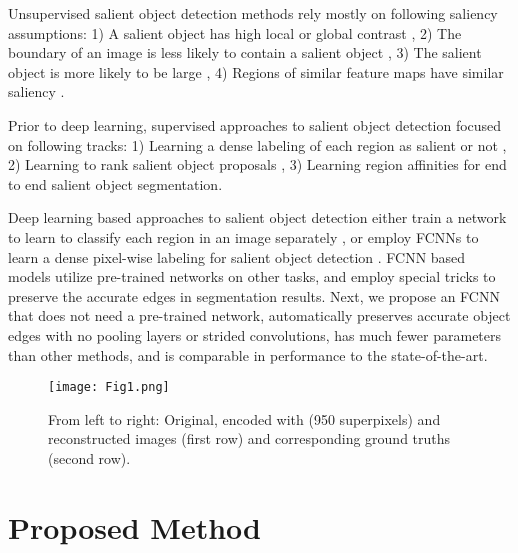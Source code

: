 \documentclass[a4paper,conference]{IEEEtran}
\begin{document}
Unsupervised salient object detection methods rely mostly on following saliency assumptions: 1) A salient object has high local or global contrast \cite{Cheng1,Aytekin1}, 2) The boundary of an image is less likely to contain a salient object \cite{Li2,Aytekin2}, 3) The salient object is more likely to be large \cite{Aytekin2}, 4) Regions of similar feature maps have similar saliency \cite{Aytekin3}.

Prior to deep learning, supervised approaches to salient object detection focused on following tracks: 1) Learning a dense labeling of each region as salient or not \cite{Jiang, Li3}, 2) Learning to rank salient object proposals \cite{Aytekin4}, 3) Learning region affinities for \cite{Aytekin5} end to end salient object segmentation.

Deep learning based approaches to salient object detection either train a network to learn to classify each region in an image separately \cite{Zhao, Li4,Gayoung}, or employ FCNNs to learn a dense pixel-wise labeling for salient object detection \cite{Wang,Li5}. FCNN based models utilize pre-trained networks on other tasks, and employ special tricks to preserve the accurate edges in segmentation results. Next, we propose an FCNN that does not need a pre-trained network, automatically preserves accurate object edges with no pooling layers or strided convolutions, has much fewer parameters than other methods, and is comparable in performance to the state-of-the-art.

\begin{figure}[!t]
\centering
\texttt{[image: Fig1.png]}
\caption{From left to right: Original, encoded with \cite{Fu} (950 superpixels) and reconstructed images (first row) and corresponding ground truths (second row).}
\label{fig1}
\end{figure}

\section{Proposed Method} \label{PropMet}
\end{document}
